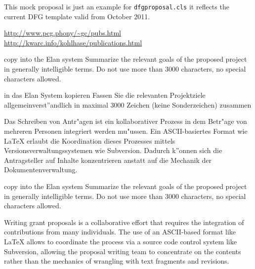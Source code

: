 \documentclass[    %
    gitinfo,       %
    noworkareas,   %
    RAM,           %
    general,       %
    \classoptions] %
    {dfgproposal}
\begin{document}
\begin{center}\color{red}\huge
  This mock proposal is just an example for \texttt{dfgproposal.cls} it reflects the 
  current DFG template valid from October 2011.
\end{center}

\urldef{\gcpubs}\url{http://www.pcg.phony/~gc/pubs.html}
\urldef{\mikopubs}\url{http://kwarc.info/kohlhase/publications.html}
\begin{proposal}[PI=miko,
  pubspage=mikopubs,
  thema=Intelligentes Schreiben von Antr\"agen,
  acronym={iPoWr},
  acrolong={\underline{I}ntelligent} {\underline{P}r\underline{o}posal} {\underline{Wr}iting},
  title=\pn: \protect\pnlong,
  totalduration=3 years,
  since=1. Feb 2009,
  start=1. Feb. 2010,
  months=24,
  RM=36,RAM=36,
  discipline=Computer Science, 
  areas=Knowledge Management]


\begin{Summary}
  \begin{todo}{copy into the Elan system}
    Summarize the relevant goals of the proposed project in generally intelligible
    terms. Do not use more than 3000 characters, no special characters allowed.
  \end{todo}
\end{Summary}

\begin{Zusammenfassung}
  \begin{todo}{in das Elan System kopieren}
    Fassen Sie die relevanten Projektziele allgemeinverst''andlich in maximal 3000 Zeichen
    (keine Sonderzeichen) zusammen
  \end{todo}
  Das Schreiben von Antr"agen ist ein kollaborativer Prozess in dem Betr"age von mehreren
  Personen integriert werden mu"ussen. Ein ASCII-basiertes Format wie {\LaTeX} erlaubt die
  Koordination dieses Prozesses mittels Versionsverwaltungssystemen wie
  Subversion. Dadurch k''onnen sich die Antragsteller auf Inhalte konzentrieren anstatt
  auf die Mechanik der Dokumentenverwaltung.
\end{Zusammenfassung}

\begin{Summary}
  \begin{todo}{copy into the Elan system}
    Summarize the relevant goals of the proposed project in generally intelligible
    terms. Do not use more than 3000 characters, no special characters allowed.
  \end{todo}
  Writing grant proposals is a collaborative effort that requires the integration of
  contributions from many individuals. The use of an ASCII-based format like {\LaTeX}
  allows to coordinate the process via a source code control system like Subversion,
  allowing the proposal writing team to concentrate on the contents rather than the
  mechanics of wrangling with text fragments and revisions.
\end{Summary}


\end{proposal}
\end{document}
